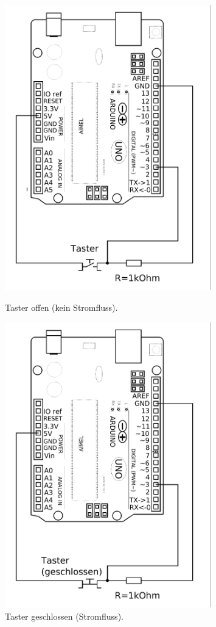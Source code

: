 \begin{figure}[H]
	\hfill
	\begin{minipage}{0.4\textwidth}
		\includegraphics[width=0.8\textwidth]{./Zeichnungen/taster-an-arduino.png}
		\caption{Taster offen (kein Stromfluss).}
	\end{minipage}
	\hfill
	\begin{minipage}{0.4\textwidth}
		\includegraphics[width=0.8\textwidth]{./Zeichnungen/taster-an-arduino-geschlossen.png}
		\caption{Taster geschlossen (Stromfluss).}
	\end{minipage}
	\hfill
	\label{abb:schaltplan-taster-pulldown}
\end{figure}
\vfill

